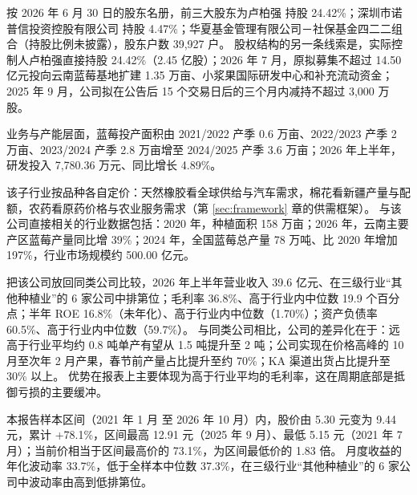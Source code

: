  按 2026 年 6 月 30 日的股东名册，前三大股东为卢柏强 持股 24.42\%；深圳市诺普信投资控股有限公司 持股 4.47\%；华夏基金管理有限公司－社保基金四二二组合（持股比例未披露），股东户数 39,927 户。 股权结构的另一条线索是，实际控制人卢柏强直接持股 24.42\%（2.45 亿股）；2026 年 7 月，原拟募集不超过 14.50 亿元投向云南蓝莓基地扩建 1.35 万亩、小浆果国际研发中心和补充流动资金；2025 年 9 月，公司拟在公告后 15 个交易日后的三个月内减持不超过 3,000 万股。

 业务与产能层面，蓝莓投产面积由 2021/2022 产季 0.6 万亩、2022/2023 产季 2 万亩、2023/2024 产季 2.8 万亩增至 2024/2025 产季 3.6 万亩；2026 年上半年，研发投入 7,780.36 万元、同比增长 4.89\%。

 该子行业按品种各自定价：天然橡胶看全球供给与汽车需求，棉花看新疆产量与配额，农药看原药价格与农业服务需求（第 \ref{sec:framework} 章的供需框架）。 与该公司直接相关的行业数据包括：2020 年，种植面积 158 万亩；2026 年，云南主要产区蓝莓产量同比增 39\%；2024 年，全国蓝莓总产量 78 万吨、比 2020 年增加 197\%，行业市场规模约 500.00 亿元。

 把该公司放回同类公司比较，2026 年上半年营业收入 39.6 亿元、在三级行业“其他种植业”的 6 家公司中排第位；毛利率 36.8\%、高于行业内中位数 19.9 个百分点；半年 ROE 16.8\%（未年化）、高于行业内中位数（1.70\%）；资产负债率 60.5\%、高于行业内中位数（59.7\%）。 与同类公司相比，公司的差异化在于：远高于行业平均约 0.8 吨单产有望从 1.5 吨提升至 2 吨；公司实现在价格高峰的 10 月至次年 2 月产果，春节前产量占比提升至约 70\%；KA 渠道出货占比提升至 30\% 以上。 优势在报表上主要体现为高于行业平均的毛利率，这在周期底部是抵御亏损的主要缓冲。

 本报告样本区间（2021 年 1 月 至 2026 年 10 月）内，股价由 5.30 元变为 9.44 元，累计 +78.1\%，区间最高 12.91 元（2025 年 9 月）、最低 5.15 元（2021 年 7 月）；当前价相当于区间最高价的 73.1\%，为区间最低价的 1.83 倍。 月度收益的年化波动率 33.7\%，低于全样本中位数 37.3\%，在三级行业“其他种植业”的 6 家公司中波动率由高到低排第位。

